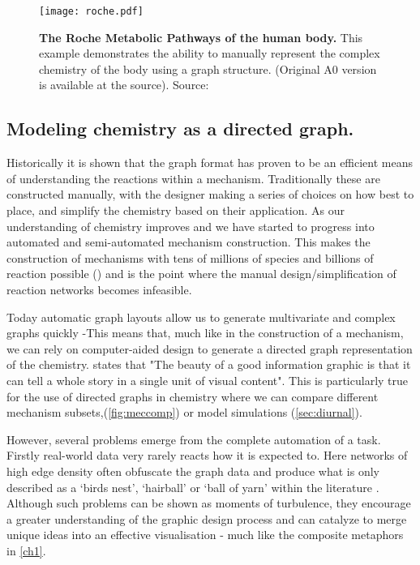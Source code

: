 \begin{landscape}[h]
\begin{figure}[h]
    \centering
    
    \vspace*{-0.025\paperheight}
        \texttt{[image: roche.pdf]}
    \vspace*{-0.015\paperheight}
       \caption{\textbf{The Roche Metabolic Pathways of the human body. }This example demonstrates the ability to manually represent the complex chemistry of the body using a graph structure. (Original A0 version is available at the source). Source: \citep{metabolic} }
       \label{fig:metabolic}
\end{figure}
\end{landscape}


\subsection{Modeling chemistry as a directed graph.}

Historically it is shown that the graph format has proven to be an efficient means of understanding the reactions within a mechanism. Traditionally these are constructed manually, with the designer making a series of choices on how best to place, and simplify the chemistry based on their application. As our understanding of chemistry improves and we have started to progress into automated and semi-automated mechanism construction. This makes the construction of mechanisms with tens of millions of species and billions of reaction possible (\citep{protocol}) and is the point where the manual design/simplification of reaction networks becomes infeasible. 

Today automatic graph layouts allow us to generate multivariate and complex graphs quickly \citep{ch3} -This means that, much like in the construction of a mechanism, we can rely on computer-aided design to generate a directed graph representation of the chemistry. \cite{sciamerican} states that "The beauty of a good information graphic is that it can tell a whole story in a single unit of visual content". This is particularly true for the use of directed graphs in chemistry where we can compare different mechanism subsets,(\autoref{fig:meccomp}) or model simulations (\autoref{sec:diurnal}).

However, several problems emerge from the complete automation of a task. Firstly real-world data very rarely reacts how it is expected to. Here networks of high edge density often obfuscate the graph data and produce what is only described as a `birds nest', `hairball' or `ball of yarn' within the literature \citep{ch7}. Although such problems can be shown as moments of turbulence, they encourage a greater understanding of the graphic design process and can catalyze to merge unique ideas into an effective visualisation \citep{goodideas} - much like the composite metaphors in \autoref{ch1}.


